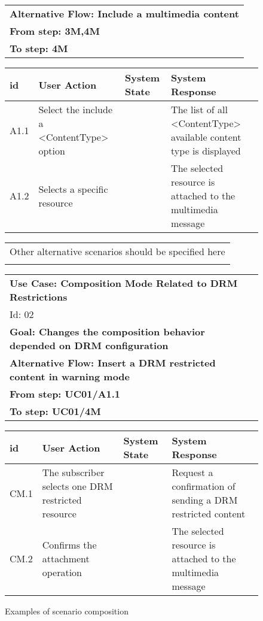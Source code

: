 \documentclass{acm_proc_article-sp}
\begin{document}
\begin{figure}[hb]
\begin{center}
\begin{tiny}
{\begin{tabular}{l}
  \\
 {\bf Alternative Flow:  Include a multimedia content} \\ 
 {\bf From step: 3M,4M} \\
  {\bf To step: 4M} \\
 \end{tabular}
   \begin{tabular}{|p{0.14in}|p{1in}|p{0.6in}|p{1in}|}
  \hline  
   id & User Action & System State & System Response \\ \hline 
  A1.1  & Select the include a <ContentType> option & &The list of all <ContentType> available content type is displayed \\ \hline
  A1.2 & Selects a specific resource & &  The selected resource is attached to the multimedia message   \\ \hline
  \end{tabular} 
  \begin{tabular}{l} 
     \\
    Other alternative scenarios should be specified here \\ \\
  \end{tabular}
  \begin{tabular}{l}
  {\bf Use Case: Composition Mode Related to DRM Restrictions}  \\ Id: 02 \\ 
  {\bf Goal: Changes the composition behavior depended on DRM configuration}   \\
  {\bf Alternative Flow:  Insert a DRM restricted content in warning mode} \\ 
  {\bf From step: UC01/A1.1 }\\
  {\bf To step: UC01/4M} \\
  \end{tabular}
   \begin{tabular}{|p{0.14in}|p{1in}|p{0.6in}|p{1in}|}
  \hline  
   id & User Action & System State & System Response \\ \hline 
  CM.1  & The subscriber selects one DRM restricted resource & & Request a confirmation of sending a DRM restricted content \\ \hline
  CM.2 & Confirms the attachment operation & &  The selected resource is attached to the multimedia message   \\ \hline
  \end{tabular} 
 } 
\end{tiny}
\end{center}
\caption{Examples of scenario composition}
\label{fig:cc-01}
\end{figure}
\end{document}
